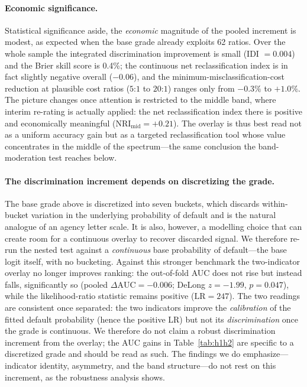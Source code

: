 \documentclass[pdflatex,sn-mathphys-ay]{sn-jnl}
\begin{document}
\paragraph{Economic significance.} Statistical significance aside, the \emph{economic} magnitude of the
pooled increment is modest, as expected when the base grade already exploits 62 ratios. Over the whole
sample the integrated discrimination improvement is small (IDI $=0.004$) and the Brier skill score is
0.4\%; the continuous net reclassification index is in fact slightly negative overall ($-0.06$), and the
minimum-misclassification-cost reduction at plausible cost ratios ($5$:$1$ to $20$:$1$) ranges only from
$-0.3\%$ to $+1.0\%$. The picture changes once attention is restricted to the middle band, where
interim re-rating is actually applied: the net reclassification index there is positive and
economically meaningful ($\text{NRI}_{\text{mid}}=+0.21$). The overlay is thus best read not as a
uniform accuracy gain but as a targeted reclassification tool whose value concentrates in the middle of
the spectrum---the same conclusion the band-moderation test reaches below.

\paragraph{The discrimination increment depends on discretizing the grade.} The base grade above is
discretized into seven buckets, which discards within-bucket variation in the underlying probability of
default and is the natural analogue of an agency letter scale. It is also, however, a modelling choice
that can create room for a continuous overlay to recover discarded signal. We therefore re-run the
nested test against a \emph{continuous} base probability of default---the base logit itself, with no
bucketing. Against this stronger benchmark the two-indicator overlay no longer improves ranking: the
out-of-fold AUC does not rise but instead falls, significantly so (pooled $\Delta\text{AUC}=-0.006$;
DeLong $z=-1.99$, $p=0.047$), while the likelihood-ratio statistic remains positive ($\text{LR}=247$). The
two readings are consistent once separated: the two indicators improve the \emph{calibration} of the
fitted default probability (hence the positive LR) but not its \emph{discrimination} once the grade is
continuous. We therefore do not claim a robust discrimination increment from the overlay; the AUC gains
in Table~\ref{tab:h1h2} are specific to a discretized grade and should be read as such. The findings we
do emphasize---indicator identity, asymmetry, and the band structure---do not rest on this increment,
as the robustness analysis shows.
\end{document}
